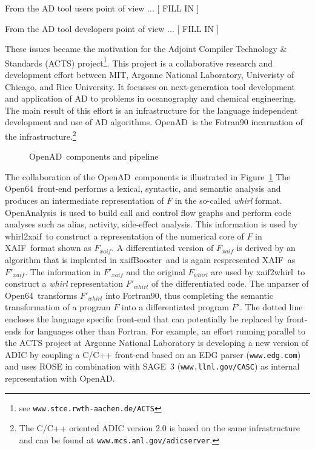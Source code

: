 \documentclass[acmtocl,acmnow]{acmtrans2m}
\newcommand{\OpenAD}{OpenAD}
\newcommand{\OpenAnalysis}{OpenAnalysis}
\newcommand{\OpenSixtyFour}{Open64}
\newcommand{\XAIF}{XAIF}
\newcommand{\xaifBooster}{xaifBooster}
\newcommand{\whirlToxaif}{whirl2xaif}
\newcommand{\xaifTowhirl}{xaif2whirl}
\newcommand{\reffig}[1]{Figure~\ref{#1}}
\begin{document}
From  the AD tool  users point of view ... 
{\color{Red} [ FILL IN ] } 

From the AD tool developers point of view ...
{\color{Red} [ FILL IN ] } 

These issues became the motivation for the 
Adjoint Compiler Technology \& Standards (ACTS) project\footnote{ 
see {\tt www.stce.rwth-aachen.de/ACTS}
}. 
This project is a collaborative
research and development effort between MIT, Argonne National Laboratory, 
Univeristy of Chicago, and Rice University. 
It focusses on  next-generation tool development and 
application of AD to problems in oceanography and chemical engineering.
The main result of this effort is an infrastructure for the language independent 
development and use of AD algorithms. 
\OpenAD\ is the Fotran90 incarnation of the infrastructure.\footnote{
The C/C++ oriented ADIC version 2.0 is based on the same infrastructure and can be found
at {\tt www.mcs.anl.gov/adicserver}.
}
\begin{figure}
\caption{\OpenAD\ components and pipeline} \label{fig:overview}
\end{figure}
The collaboration  of the \OpenAD\  components is illustrated in 
\reffig{fig:overview}
The \OpenSixtyFour\ front-end performs a lexical, 
syntactic, and semantic analysis and produces an 
intermediate representation of $F$ in the so-called {\em whirl} format.
\OpenAnalysis\ is used to build call and control flow graphs and  perform 
code analyses such as alias, activity, side-effect analysis.
This information is used by 
\whirlToxaif\ to construct a representation of the numerical core of $F$ in
\XAIF\ format shown as $F_{xaif}$.  
A differentiated version of $F_{xaif}$ is derived by an 
algorithm that is implented in \xaifBooster\ and is again respresented 
\XAIF\ as $F'_{xaif}$.
The information in $F'_{xaif}$ and the original $F_{whirl}$ are used by 
\xaifTowhirl\ to construct a 
{\em whirl} representation $F'_{whirl}$ of the differentiated code. 
The unparser of 
\OpenSixtyFour\ transforms $F'_{whirl}$ into Fortran90, thus completing
the semantic transformation of a program $F$ into
a differentiated program $F'$.
The dotted line encloses the language specific front-end that can potentially
be replaced by front-ends for languages other than Fortran. 
For example, an 
effort running parallel to the ACTS project at Argonne National Laboratory is 
developing a new version of ADIC \cite{HoNo01} by coupling a C/C++ 
front-end 
based on an EDG parser ({\tt www.edg.com}) and uses ROSE in combination with SAGE~3 ({\tt www.llnl.gov/CASC}) as internal representation
with \OpenAD.
\end{document}
